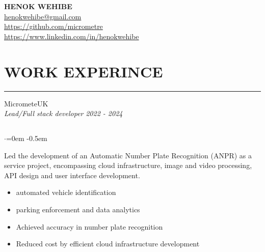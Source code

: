 \documentclass{article}
\begin{document}
\begin{center}
\textbf{\huge HENOK WEHIBE} \\
\vspace{1.5em}
\href{mailto:henokwehibe@gmail.com}{henokwehibe@gmail.com} \\
\vspace{0.5em}
\href{https://github.com/micrometre}{https://github.com/micrometre }\\
\vspace{0.5em}
\href{https://www.linkedin.com/in/henokwehibe}{https://www.linkedin.com/in/henokwehibe}
\end{center}


\section* {WORK EXPERINCE}
\vspace{-0.6em}
\hrule 
\vspace{0.4em}
{\bf}MicrometeUK \hfill {} \\%
{\em Lead/Full stack developer} \hfill {\em 2022 - 2024 } %
\subsection*{}
\vspace{-2.6em}
\begin{list}{$\cdot$}{\leftmargin=0em} %
    \itemsep -0.5em \vspace{-0.5em} %
    \item Led the development of an Automatic Number Plate Recognition (ANPR) as a service project, encompassing  cloud infrastructure, image and video  processing, API design and  user interface development.
\end{list}
\vspace{-1.6em}
\begin{itemize}
    \item automated vehicle identification 
    \item parking enforcement and data analytics
    \item Achieved  accuracy in number plate recognition  
    \item Reduced cost by  efficient cloud infrastructure development
\end{itemize}
\end{document}
